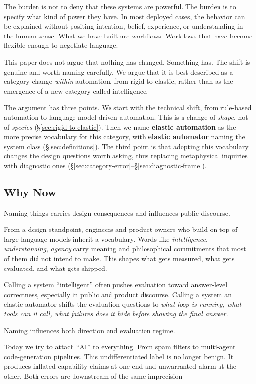 \documentclass[11pt,a4paper]{article}
\begin{document}
The burden is not to deny that these systems are powerful. The burden is to specify what kind of power they have. In most deployed cases, the behavior can be explained without positing intention, belief, experience, or understanding in the human sense. What we have built are workflows. Workflows that have become flexible enough to negotiate language.

This paper does not argue that nothing has changed. Something has. The shift is genuine and worth naming carefully. We argue that it is best described as a category change \textit{within} automation, from rigid to elastic, rather than as the emergence of a new category called intelligence.

The argument has three points. We start with the technical shift, from rule-based automation to language-model-driven automation. This is a change of \textit{shape}, not of \textit{species} (\S\ref{sec:rigid-to-elastic}). Then we name \textbf{elastic automation} as the more precise vocabulary for this category, with \textbf{elastic automator} naming the system class (\S\ref{sec:definitions}). The third point is that adopting this vocabulary changes the design questions worth asking, thus replacing metaphysical inquiries with diagnostic ones (\S\ref{sec:category-error}--\S\ref{sec:diagnostic-frame}).

\subsection{Why Now}

Naming things carries design consequences and influences public discourse.

From a design standpoint, engineers and product owners who build on top of large language models inherit a vocabulary. Words like \textit{intelligence}, \textit{understanding}, \textit{agency} carry meaning and philosophical commitments that most of them did not intend to make. This shapes what gets measured, what gets evaluated, and what gets shipped.

Calling a system ``intelligent'' often pushes evaluation toward answer-level correctness, especially in public and product discourse. Calling a system an elastic automator shifts the evaluation questions to \textit{what loop is running, what tools can it call, what failures does it hide before showing the final answer.}

Naming influences both direction and evaluation regime.

Today we try to attach ``AI'' to everything. From spam filters to multi-agent code-generation pipelines. This undifferentiated label is no longer benign. It produces inflated capability claims at one end and unwarranted alarm at the other. Both errors are downstream of the same imprecision.
\end{document}
